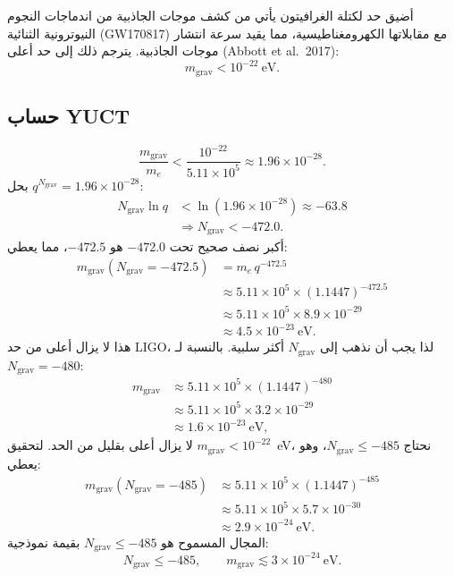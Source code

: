 \documentclass[12pt,a4paper]{article}
\begin{document}
	أضيق حد لكتلة الغرافيتون يأتي من كشف موجات الجاذبية من اندماجات النجوم النيوترونية الثنائية (GW170817) مع مقابلاتها الكهرومغناطيسية، مما يقيد سرعة انتشار موجات الجاذبية. يترجم ذلك إلى حد أعلى (Abbott et al.\ 2017):
	\[
	m_{\mathrm{grav}} < 10^{-22}~\mathrm{eV}.
	\]
	
	\subsection{حساب YUCT}
	
	\[
	\frac{m_{\mathrm{grav}}}{m_e} < \frac{10^{-22}}{5.11\times10^5} \approx 1.96\times 10^{-28}.
	\]
	بحل $q^{N_{\mathrm{grav}}} = 1.96\times10^{-28}$:
	\[
	\begin{aligned}
		N_{\mathrm{grav}} \ln q &< \ln(1.96\times10^{-28}) \approx -63.8 \\
		&\Longrightarrow N_{\mathrm{grav}} < -472.0 .
	\end{aligned}
	\]
	أكبر نصف صحيح تحت $-472.0$ هو $-472.5$، مما يعطي:
	\[
	\begin{aligned}
		m_{\mathrm{grav}}(N_{\mathrm{grav}} = -472.5) &= m_e \, q^{-472.5} \\
		&\approx 5.11\times10^5 \times (1.1447)^{-472.5} \\
		&\approx 5.11\times10^5 \times 8.9\times10^{-29} \\
		&\approx 4.5 \times 10^{-23}~\mathrm{eV}.
	\end{aligned}
	\]
	هذا لا يزال أعلى من حد LIGO، لذا يجب أن نذهب إلى $N_{\mathrm{grav}}$ أكثر سلبية. بالنسبة لـ $N_{\mathrm{grav}} = -480$:
	\[
	\begin{aligned}
		m_{\mathrm{grav}} &\approx 5.11\times10^5 \times (1.1447)^{-480} \\
		&\approx 5.11\times10^5 \times 3.2\times10^{-29} \\
		&\approx 1.6 \times 10^{-23}~\mathrm{eV},
	\end{aligned}
	\]
	لا يزال أعلى بقليل من الحد. لتحقيق $m_{\mathrm{grav}} < 10^{-22}$~eV، نحتاج $N_{\mathrm{grav}} \le -485$، وهو يعطي:
	\[
	\begin{aligned}
		m_{\mathrm{grav}}(N_{\mathrm{grav}} = -485) &\approx 5.11\times10^5 \times (1.1447)^{-485} \\
		&\approx 5.11\times10^5 \times 5.7\times10^{-30} \\
		&\approx 2.9 \times 10^{-24}~\mathrm{eV}.
	\end{aligned}
	\]
	المجال المسموح هو $N_{\mathrm{grav}} \le -485$ بقيمة نموذجية:
	\[
	\boxed{N_{\mathrm{grav}} \le -485}, \qquad
	\boxed{m_{\mathrm{grav}} \lesssim 3 \times 10^{-24}~\mathrm{eV}} .
	\]
	
\end{document}
